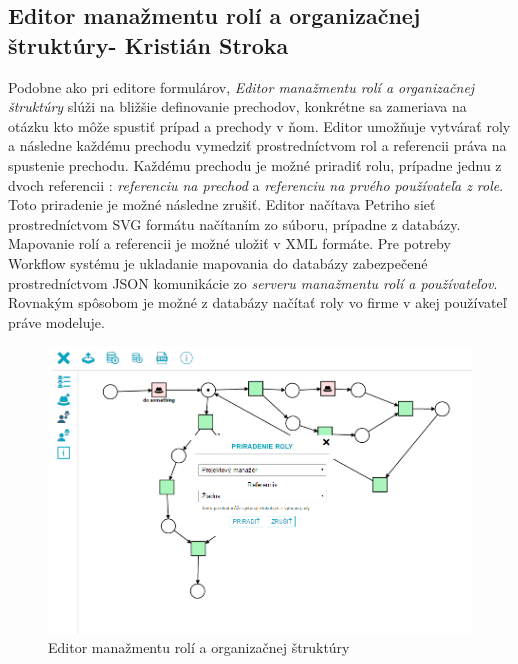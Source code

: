 \subsection{Editor manažmentu rolí a organizačnej štruktúry- Kristián Stroka}
\label{Editor manažmentu rolí a organizačnej štruktúry}
Podobne ako pri editore formulárov, \emph{Editor manažmentu rolí a organizačnej štruktúry} slúži na bližšie definovanie prechodov, konkrétne sa zameriava na otázku kto môže spustiť prípad a prechody v ňom. Editor umožňuje vytvárať roly a následne každému prechodu vymedziť prostredníctvom  rol a referencii práva na spustenie prechodu. Každému prechodu je možné priradiť rolu, prípadne jednu z dvoch referencii : \emph{referenciu na prechod} a \emph{referenciu na prvého používateľa z role}. Toto priradenie je možné následne zrušiť. Editor načítava Petriho sieť prostredníctvom SVG formátu načítaním zo súboru, prípadne z databázy. Mapovanie rolí a referencii je možné uložiť v XML formáte. Pre potreby Workflow systému je ukladanie mapovania do databázy zabezpečené prostredníctvom JSON komunikácie  zo \emph{serveru manažmentu rolí a používateľov}. Rovnakým spôsobom je možné z databázy načítať roly vo firme v akej používateľ práve modeluje.

\begin{figure}[h]
	\centering
	\includegraphics[width=0.7\linewidth]{images/kristian}
	\caption{Editor manažmentu rolí a organizačnej štruktúry}
	\label{fig:Editor manažmentu rolí a organizačnej štruktúry}
\end{figure}


